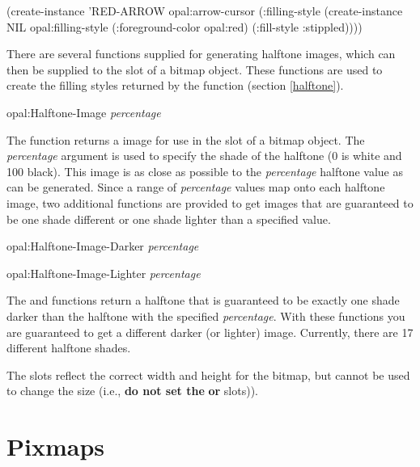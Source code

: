 \begin{programexample}
(create-instance 'RED-ARROW opal:arrow-cursor
   (:filling-style (create-instance NIL opal:filling-style
                      (:foreground-color opal:red)
                      (:fill-style :stippled))))
\end{programexample}


There are several functions supplied for generating halftone images, which
can then be supplied to the  slot of a bitmap object.  These
functions are used to create the filling styles returned by the
 function (section \ref{halftone}).
\vspace{1 line}
\begin{programexample}
opal:Halftone-Image {\it percentage}\value{function}
\end{programexample}
The  function returns a image for use in the
 slot of a bitmap object. The {\it percentage} argument is
used to specify the
shade of the halftone (0 is white and 100 black). This image is as close
as possible to the {\it percentage} halftone value as can be generated.
Since a range of {\it percentage} values map onto each halftone image, two
additional functions are provided to get images that are guaranteed to be
one shade different or one shade lighter than a specified value.

\vspace{1 line}

\begin{programexample}
opal:Halftone-Image-Darker {\it percentage}\value{function}

opal:Halftone-Image-Lighter {\it percentage}\value{function}
\end{programexample}

The  and 
functions return a halftone that is guaranteed to be exactly one shade
darker than the halftone with the specified {\it percentage}. With these
functions you are guaranteed to get a different darker (or lighter)
image.  Currently, there are 17 different halftone shades.

The  slots reflect the correct width and
height for the bitmap, but cannot be used to change the size (i.e.,
{\bf do not set the}  {\bf or}  slots)).



\section{Pixmaps}


